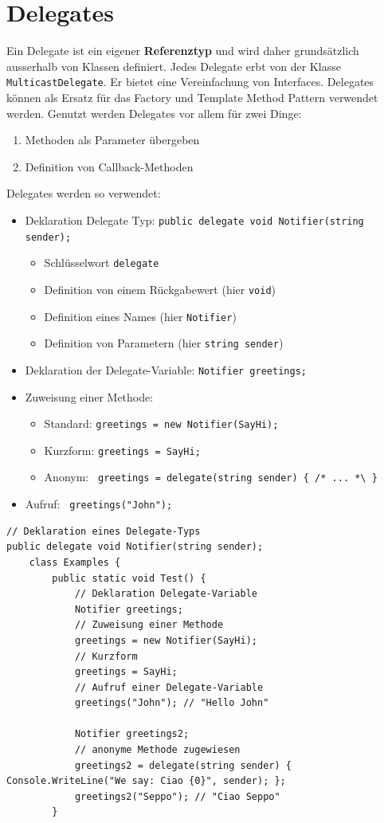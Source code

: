 \documentclass[
a4paper,
oneside,
10pt,
fleqn,
headsepline,
toc=listofnumbered, 
bibliography=totocnumbered]{scrartcl}
\let\stdsection\section
\renewcommand\section{\clearpage\stdsection}
\begin{document}
\section{Delegates}
Ein Delegate ist ein eigener \textbf{Referenztyp} und wird daher grundsätzlich ausserhalb von Klassen definiert. Jedes Delegate erbt von der Klasse \lstinline|MulticastDelegate|. Er bietet eine Vereinfachung von Interfaces. Delegates können als Ersatz für das Factory und Template Method Pattern verwendet werden.
Genutzt werden Delegates vor allem für zwei Dinge:
\begin{enumerate}
	\item Methoden als Parameter übergeben
	\item Definition von Callback-Methoden
\end{enumerate}
Delegates werden so verwendet:
\begin{itemize}
	\item Deklaration Delegate Typ: \lstinline|public delegate void Notifier(string sender);|
	      \begin{itemize}
		      \item Schlüsselwort \lstinline|delegate|
		      \item Definition von einem Rückgabewert (hier \lstinline|void|)
		      \item Definition eines Names (hier \lstinline|Notifier|)
		      \item Definition von Parametern (hier \lstinline|string sender|)
	      \end{itemize}
	\item Deklaration der Delegate-Variable: \lstinline|Notifier greetings;|
	\item Zuweisung einer Methode:
	      \begin{itemize}
		      \item Standard: \lstinline|greetings = new Notifier(SayHi);|
		      \item Kurzform: \lstinline|greetings = SayHi; |
		      \item Anonym: \lstinline| greetings = delegate(string sender) { /* ... *\ } |
	      \end{itemize}
	\item Aufruf: \lstinline| greetings("John");|
\end{itemize}
\begin{lstlisting}
// Deklaration eines Delegate-Typs 
public delegate void Notifier(string sender);
    class Examples {
        public static void Test() {
            // Deklaration Delegate-Variable
            Notifier greetings;
            // Zuweisung einer Methode 
            greetings = new Notifier(SayHi);
            // Kurzform 
            greetings = SayHi;
            // Aufruf einer Delegate-Variable 
            greetings("John"); // "Hello John"
            
            Notifier greetings2;
            // anonyme Methode zugewiesen
            greetings2 = delegate(string sender) { Console.WriteLine("We say: Ciao {0}", sender); };
            greetings2("Seppo"); // "Ciao Seppo"
        }
\end{lstlisting}
\end{document}
